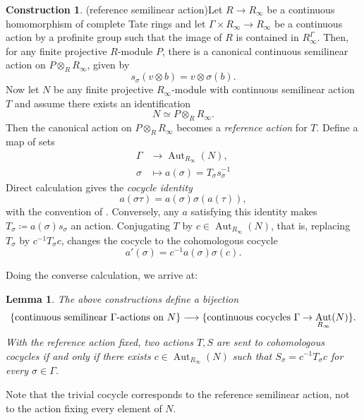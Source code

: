 \documentclass[10pt,twoside]{article}
\numberwithin{equation}{section}
\theoremstyle{plain}
\newtheorem{mylemma}[mythm]{Lemma}
\theoremstyle{definition}
\newtheorem{myconst}[mythm]{Construction}
\DeclareMathOperator{\Aut}{Aut}
\begin{document}
\begin{myconst}(reference semilinear action)\label{proposalReferenceAction}
Let \(R\to R_\infty\) be a continuous homomorphism of complete Tate rings and let \(\Gamma\times R_\infty\to R_\infty\) be a continuous action by a profinite group such that the image of \(R\) is contained in \(R_\infty^\Gamma\). Then, for any finite projective \(R\)-module \(P\), there is a canonical continuous semilinear action on \(P\otimes_R R_\infty\), given by
\[
s_\sigma(v\otimes b)=v\otimes\sigma(b).
\]
Now let \(N\) be any finite projective \(R_\infty\)-module with continuous semilinear action \(T\) and assume there exists an identification
\[
N\simeq P\otimes_R R_\infty.
\]
Then the canonical action on \(P\otimes_R R_\infty\) becomes a \emph{reference action} for \(T\). Define a map of sets
\begin{align*}
\Gamma &\longrightarrow \Aut_{R_\infty}(N),\\
\sigma&\mapsto a(\sigma)=T_\sigma s_\sigma^{-1}
\end{align*}
Direct calculation gives the \emph{cocycle identity}
\[a(\sigma\tau)=a(\sigma)\sigma(a(\tau)),\]
with the convention of \cite[\S2.2]{Sen}. Conversely, any \(a\) satisfying this identity makes \(T_\sigma\coloneqq a(\sigma)s_\sigma\) an action. Conjugating \(T\) by \(c\in\Aut_{R_\infty}(N)\), that is, replacing \(T_\sigma\) by \(c^{-1}T_\sigma c\), changes the cocycle to the cohomologous cocycle
\[
a'(\sigma)=c^{-1}a(\sigma)\sigma(c).
\]
\end{myconst}
Doing the converse calculation, we arrive at:


\begin{mylemma}
The above constructions define a bijection
\[\{\text{\emph{continuous semilinear \(\Gamma\)-actions on \(N\)}}\} \longrightarrow \{\text{\emph{continuous cocycles \(\Gamma\to \Aut_{R_\infty}(N)\)}}\}.\]
With the reference action fixed, two actions \(T,S\) are sent to cohomologous cocycles if and only if there exists \(c\in\Aut_{R_\infty}(N)\) such that \(S_\sigma=c^{-1}T_\sigma c\) for every \(\sigma\in\Gamma\).
\end{mylemma}

Note that the trivial cocycle corresponds to the reference semilinear action, not to the action fixing every element of \(N\).
\end{document}
